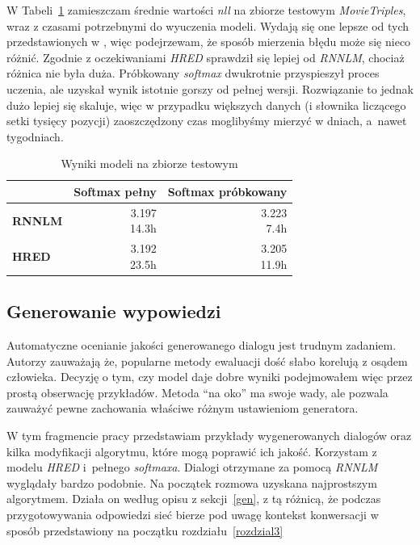 W Tabeli~\ref{hredtab} zamieszczam średnie wartości \textit{nll} na zbiorze testowym \textit{MovieTriples}, wraz z czasami potrzebnymi do wyuczenia modeli. Wydają się one lepsze od tych przedstawionych w \cite{serbanhred}, więc podejrzewam, że sposób mierzenia błędu może się nieco różnić. Zgodnie z oczekiwaniami \textit{HRED} sprawdził się lepiej od \textit{RNNLM}, chociaż różnica nie była duża. Próbkowany \textit{softmax} dwukrotnie przyspieszył proces uczenia, ale uzyskał wynik istotnie gorszy od pełnej wersji. Rozwiązanie to jednak dużo lepiej się skaluje, więc w przypadku większych danych (i słownika liczącego setki tysięcy pozycji) zaoszczędzony czas moglibyśmy mierzyć w dniach, a~nawet tygodniach.

\setlength{\tabcolsep}{3pt}
\begin{table}[H]
    \centering
    \caption{Wyniki modeli na zbiorze testowym}
    \label{hredtab}
    \begin{tabular}{|l|r|r|}
        \hhline{~--}
        \multicolumn{1}{c|}{} & \cellcolor[gray]{.85}\textbf{Softmax pełny} & \cellcolor[gray]{.85}\textbf{Softmax próbkowany}\\
        \hline
        \cellcolor[gray]{.85}\textbf{RNNLM} & \makecell[r]{3.197\\14.3h} & \makecell[r]{3.223\\7.4h} \\
        \hline
        \cellcolor[gray]{.85}\textbf{HRED} & \makecell[r]{3.192\\23.5h} & \makecell[r]{3.205\\11.9h} \\
        \hline
    \end{tabular}\par
\end{table}


\subsection{Generowanie wypowiedzi}

Automatyczne ocenianie jakości generowanego dialogu jest trudnym zadaniem. Autorzy \cite{hownotto} zauważają że, popularne metody ewaluacji dość słabo korelują z osądem człowieka. Decyzję o tym, czy model daje dobre wyniki podejmowałem więc przez prostą obserwację przykładów. Metoda ``na oko'' ma swoje wady, ale pozwala zauważyć pewne zachowania właściwe różnym ustawieniom generatora.

W tym fragmencie pracy przedstawiam przykłady wygenerowanych dialogów oraz kilka modyfikacji algorytmu, które mogą poprawić ich jakość. Korzystam z modelu \textit{HRED} i~pełnego \textit{softmaxa}. Dialogi otrzymane za pomocą \textit{RNNLM} wyglądały bardzo podobnie. Na początek rozmowa uzyskana najprostszym algorytmem. Działa on według opisu z sekcji~\ref{gen}, z tą różnicą, że podczas przygotowywania odpowiedzi sieć bierze pod uwagę kontekst konwersacji w sposób przedstawiony na początku rozdziału~\ref{rozdzial3}\\

